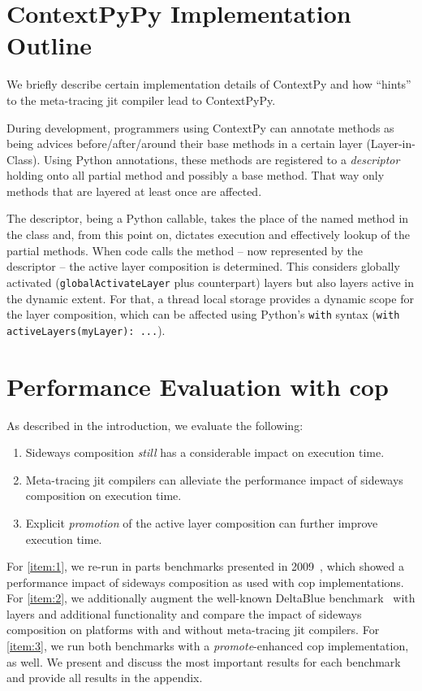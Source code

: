 \documentclass[preprint,english,10pt,nonatbib]{sigplanconf}
\begin{document}
\section{ContextPyPy Implementation Outline}
\begingroup
\lstset{language=Python}

We briefly describe certain implementation details of ContextPy and how
``hints'' to the meta-tracing \ac{jit} compiler lead to ContextPyPy.

During development, programmers using ContextPy can annotate methods as being
advices before/after/around their base methods in a certain layer
(Layer-in-Class). Using Python annotations, these methods are registered to a
\emph{descriptor} holding onto all partial method and possibly a base method. That way
only methods that are layered at least once are affected.

The descriptor, being a Python callable, takes the place of the named method in
the class and, from this point on, dictates execution and effectively lookup of
the partial methods. When code calls the method \--- now represented by the
descriptor \--- the active layer composition is determined. This considers
globally activated (\lstinline|globalActivateLayer| plus counterpart) layers
but also layers active in the dynamic extent. For that, a thread local storage
provides a dynamic scope for the layer composition, which can be affected using
Python's \lstinline|with| syntax (\lstinline|with activeLayers(myLayer): ...|).



%


\section{Performance Evaluation with \acs{cop}}


As described in the introduction, we evaluate the following:
\begin{enumerate}
\item Sideways composition \emph{still} has a considerable impact on execution
  time.
\label{item:1}
\item Meta-tracing \ac{jit} compilers can alleviate the performance impact of
  sideways composition on execution time.
\label{item:2}
\item Explicit \emph{promotion} of the active layer composition can further
  improve execution time.
\label{item:3}
\end{enumerate}
%
For \ref{item:1}, we re-run in parts benchmarks presented in
2009~\cite{appeltauer+:2009:comparison-context-oriented}, which showed a
performance impact of sideways composition as used with \ac{cop}
implementations. For \ref{item:2}, we additionally augment the well-known
DeltaBlue benchmark~\cite{freeman-benson+:1989:deltablue-algorithm:} with
layers and additional functionality and compare the impact of sideways
composition on platforms with and without meta-tracing \ac{jit} compilers.
For \ref{item:3}, we run both benchmarks with a \emph{promote}-enhanced
\ac{cop} implementation, as well.
We present and discuss the most important results for each benchmark and
provide all results in the appendix.
\end{document}
